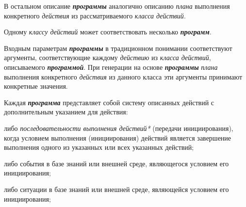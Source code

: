 \begin{SCn}
{В остальном описание \textbf{\textit{программы}} аналогично описанию \textit{плана} выполнения конкретного \textit{действия} из рассматриваемого \textit{класса действий}.

Одному \textit{классу действий} может соответствовать несколько \textbf{\textit{программ}}.

Входным параметрам \textbf{\textit{программы}} в традиционном понимании соответствуют аргументы, соответствующие каждому \textit{действию} из \textit{класса действий}, описываемого \textbf{\textit{программой}}. При генерации на основе \textbf{\textit{программы}} \textit{плана} выполнения конкретного \textit{действия} из данного класса эти аргументы принимают конкретные значения.

Каждая \textbf{\textit{программа}} представляет собой систему описанных действий с дополнительным указанием для действия:
\begin{scnitemize}
    \item либо \textit{последовательности выполнения действий*} (передачи инициирования), когда условием выполнения (инициирования) действий является завершение выполнения одного из указанных или всех указанных действий;
    \item либо события в базе знаний или внешней среде, являющегося условием его инициирования;
    \item либо ситуации в базе знаний или внешней среде, являющейся условием его инициирования;
\end{scnitemize}
}






\end{SCn}
